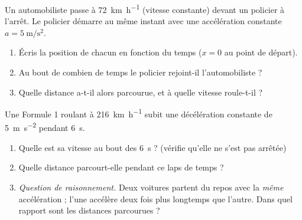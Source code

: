 \documentclass[11pt,a4paper]{article}
\begin{document}
\begin{exo}
Un automobiliste passe à \qty{72}{\kilo\metre\per\hour} (vitesse constante) devant un policier à l'arrêt.
Le policier démarre au même instant avec une accélération constante $a=\qty{5}{\metre\per\second\squared}$.
\begin{enumerate}[label=\alph*)]
  \item Écris la position de chacun en fonction du temps ($x=0$ au point de départ).
  \item Au bout de combien de temps le policier rejoint-il l'automobiliste ?
  \item Quelle distance a-t-il alors parcourue, et à quelle vitesse roule-t-il ?
\end{enumerate}
\end{exo}

\begin{exo}
Une Formule 1 roulant à \qty{216}{\kilo\metre\per\hour} subit une décélération constante de \qty{5}{\metre\per\second\squared} pendant \qty{6}{\second}.
\begin{enumerate}[label=\alph*)]
  \item Quelle est sa vitesse au bout des \qty{6}{\second} ? (vérifie qu'elle ne s'est pas arrêtée)
  \item Quelle distance parcourt-elle pendant ce laps de temps ?
  \item \emph{Question de raisonnement.} Deux voitures partent du repos avec la \emph{même} accélération ; l'une accélère deux fois plus longtemps que l'autre. Dans quel rapport sont les distances parcourues ?
\end{enumerate}
\end{exo}
\end{document}

